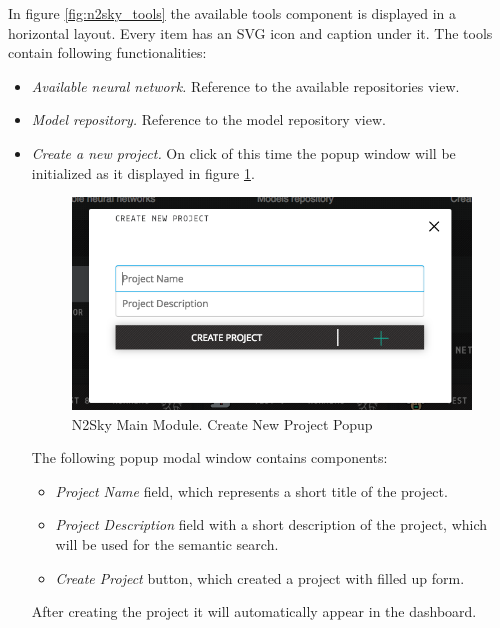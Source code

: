 In figure \ref{fig:n2sky_tools} the available tools component is displayed in a horizontal layout. Every item has an SVG icon and caption under it. The tools contain following functionalities: 
\begin{itemize}
\item \emph{Available neural network.} Reference to the available repositories view.  
\item \emph{Model repository.} Reference to the model repository view.
\item \emph{Create a new project.} On click of this time the popup window will be initialized as it displayed in figure \ref{fig:popupcreatenewproject}.


\begin{figure}[htbp]
\begin{center}
  \includegraphics[scale=0.5]{components/5/img/popupcreatenewproject.png}
  \caption{N2Sky Main Module. Create New Project Popup}
  \label{fig:popupcreatenewproject}
\end{center}
\end{figure}


The following popup modal window contains components:
\begin{itemize}
\item \emph{Project Name} field, which represents a short title of the project.
\item \emph{Project Description} field with a short description of the project, which will be used for the semantic search.  
\item \emph{Create Project} button, which created a project with filled up form.
\end{itemize}

After creating the project it will automatically appear in the dashboard. 

\end{itemize}

